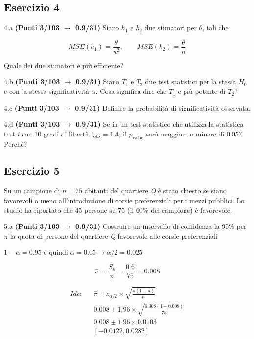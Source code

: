 \documentclass[
  11pt,
]{book}
\theoremstyle{mytheoremstyle}
\theoremstyle{mydefstyle}
\newenvironment{sol}
  {
  \begin{tcolorbox}[enhanced,breakable,arc=0.1mm,boxrule=1pt,colback=white,colframe=iblue,
  title=\bf \fontfamily{lmss}\selectfont \hspace{.5 cm} Soluzione,drop fuzzy shadow]

}{
\end{tcolorbox}
  }
\begin{document}
\subsection{Esercizio 4}\label{esercizio-4-14}

4.a \textbf{(Punti 3/103 \(\rightarrow\) 0.9/31)} Siano \(h_1\) e \(h_2\) due stimatori per \(\theta\), tali che

\[
  MSE(h_1) =  \frac{\theta}{n^2}, \qquad  MSE(h_2) =  \frac{\theta}{n}
\]

Quale dei due stimatori è più efficiente?

4.b \textbf{(Punti 3/103 \(\rightarrow\) 0.9/31)} Siano \(T_1\) e \(T_2\) due test statistici per la stessa \(H_0\) e con la stessa significatività \(\alpha\). Cosa significa dire che \(T_1\) e più potente di \(T_2\)?

4.c \textbf{(Punti 3/103 \(\rightarrow\) 0.9/31)} Definire la probabilità di significatività osservata.

4.d \textbf{(Punti 3/103 \(\rightarrow\) 0.9/31)} Se in un test statistico che utilizza la statistica test \emph{t} con 10 gradi di libertà \(t_\text{obs}=1.4\), il \(p_\text{value}\) sarà maggiore o minore di 0.05? Perché?

\subsection{Esercizio 5}\label{esercizio-5-12}

Su un campione di \(n=75\) abitanti del quartiere \emph{Q} è stato chiesto se siano favorevoli o meno all'introduzione di corsie preferenziali per i mezzi pubblici. Lo studio ha riportato che 45 persone su 75 (il 60\% del campione) è favorevole.

5.a \textbf{(Punti 3/103 \(\rightarrow\) 0.9/31)} Costruire un intervallo di confidenza la 95\% per \(\pi\) la quota di persone del quartiere \emph{Q} favorevole alle corsie preferenziali

\begin{sol}
\(1-\alpha =0.95\) e quindi \(\alpha=0.05\rightarrow \alpha/2=0.025\)

\[
  \hat\pi = \frac{S_n}n = \frac{ 0.6 }{ 75 }= 0.008 
\]

\begin{eqnarray*}
  Idc: & &  \hat\pi \pm  z_{\alpha/2} \times \sqrt{\frac{\hat\pi(1-\hat\pi)}{n}} \\
     & &  0.008 \pm  1.96 \times \sqrt{\frac{ 0.008 (1- 0.008 )}{ 75 }} \\
     & &  0.008 \pm  1.96 \times  0.0103 \\
     & & [ -0.0122 ,  0.0282 ]
\end{eqnarray*}

\end{sol}
\end{document}
